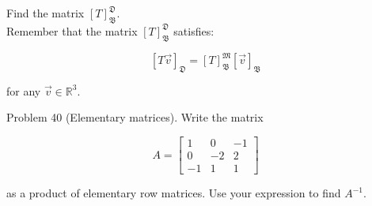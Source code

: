 \documentclass[10pt]{article}
\begin{document}
Find the matrix $[T]_{\mathfrak{B}}^{\mathfrak{D}}$.\\
Remember that the matrix $[T]_{\mathfrak{B}}^{\mathfrak{D}}$ satisfies:

$$
[T \vec{v}]_{\mathfrak{D}}=[T]_{\mathfrak{B}}^{\mathfrak{M}}[\vec{v}]_{\mathfrak{B}}
$$

for any $\vec{v} \in \mathbb{R}^{3}$.

Problem 40 (Elementary matrices). Write the matrix

$$
A=\left[\begin{array}{ccc}
1 & 0 & -1 \\
0 & -2 & 2 \\
-1 & 1 & 1
\end{array}\right]
$$

as a product of elementary row matrices. Use your expression to find $A^{-1}$.
\end{document}
